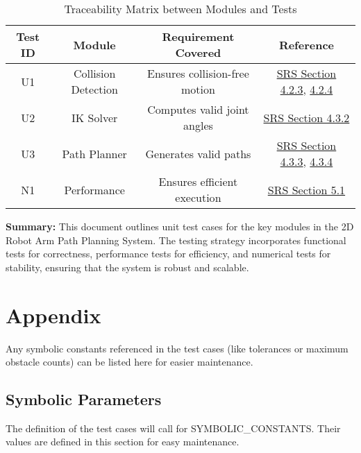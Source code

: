 \documentclass[12pt, titlepage]{article}
\begin{document}
\begin{table}[h]
    \centering
    \caption{Traceability Matrix between Modules and Tests}
    \begin{tabular}{|c|c|c|c|}
    \hline
    \textbf{Test ID} & \textbf{Module} & \textbf{Requirement Covered} & \textbf{Reference} \\
    \hline
    U1 & Collision Detection & Ensures collision-free motion & \href{SRS.pdf#section.4.2.3}{SRS Section 4.2.3}, \href{SRS.pdf#section.4.2.4}{4.2.4} \\
    U2 & IK Solver & Computes valid joint angles & \href{SRS.pdf#section.4.3.2}{SRS Section 4.3.2} \\
    U3 & Path Planner & Generates valid paths & \href{SRS.pdf#section.4.3.3}{SRS Section 4.3.3}, \href{SRS.pdf#section.4.3.4}{4.3.4} \\
    N1 & Performance & Ensures efficient execution & \href{SRS.pdf#section.5.1}{SRS Section 5.1} \\
    \hline
    \end{tabular}
    \end{table}
    



\textbf{Summary:} This document outlines unit test cases for the key modules in the 2D Robot Arm Path Planning System. The testing strategy incorporates functional tests for correctness, performance tests for efficiency, and numerical tests for stability, ensuring that the system is robust and scalable.





\newpage


\section{Appendix}

Any symbolic constants referenced in the test cases (like tolerances or maximum obstacle counts) can be listed here for easier maintenance.

\subsection{Symbolic Parameters}

The definition of the test cases will call for SYMBOLIC\_CONSTANTS.
Their values are defined in this section for easy maintenance.



\newpage{}
\end{document}
